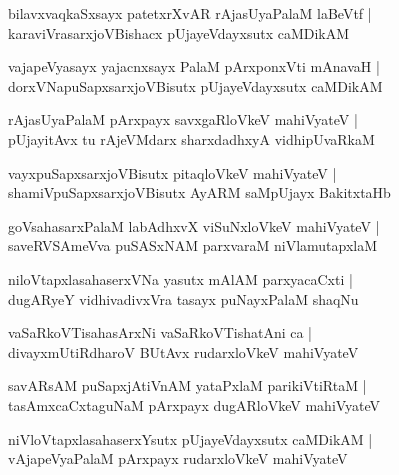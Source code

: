 \documentclass[twoside,12pt,openright]{book}
\newcounter{shloka}[chapter]
\begin{document}
\begin{shloka}%
bilavxvaqkaSxsayx patetxrXvAR rAjasUyaPalaM laBeVtf |\\
karaviVrasarxjoVBishacx pUjayeVdayxsutx caMDikAM 
\end{shloka}

\begin{shloka}%
vajapeVyasayx yajacnxsayx PalaM pArxponxVti mAnavaH |\\
dorxVNapuSapxsarxjoVBisutx pUjayeVdayxsutx caMDikAM 
\end{shloka}

\begin{shloka}%
rAjasUyaPalaM pArxpayx savxgaRloVkeV mahiVyateV |\\
pUjayitAvx tu rAjeVMdarx sharxdadhxyA vidhipUvaRkaM 
\end{shloka}

\begin{shloka}%
vayxpuSapxsarxjoVBisutx pitaqloVkeV mahiVyateV |\\
shamiVpuSapxsarxjoVBisutx AyARM saMpUjayx BakitxtaHb 
\end{shloka}

\begin{shloka}%
goVsahasarxPalaM labAdhxvX viSuNxloVkeV mahiVyateV |\\
saveRVSAmeVva puSASxNAM parxvaraM niVlamutapxlaM 
\end{shloka}

\begin{shloka}%
niloVtapxlasahaserxVNa yasutx mAlAM parxyacaCxti |\\
dugARyeY vidhivadivxVra tasayx puNayxPalaM shaqNu
\end{shloka}

\begin{shloka}%
vaSaRkoVTisahasArxNi vaSaRkoVTishatAni ca |\\
divayxmUtiRdharoV BUtAvx rudarxloVkeV mahiVyateV 
\end{shloka}

\begin{shloka}%
savARsAM puSapxjAtiVnAM yataPxlaM parikiVtiRtaM |\\
tasAmxcaCxtaguNaM pArxpayx dugARloVkeV mahiVyateV 
\end{shloka}

\begin{shloka}%
niVloVtapxlasahaserxYsutx pUjayeVdayxsutx caMDikAM |\\
vAjapeVyaPalaM pArxpayx rudarxloVkeV mahiVyateV 
\end{shloka}
\end{document}
